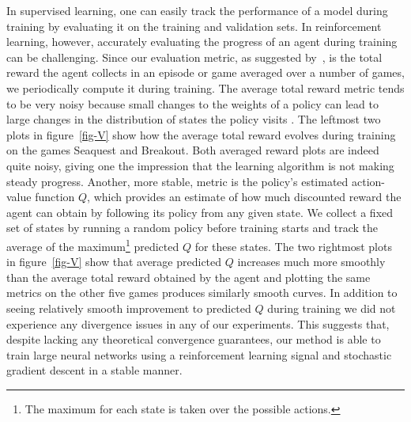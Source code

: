In supervised learning, one can easily track the performance of a model during training by evaluating it on the training and validation sets. In reinforcement learning, however, accurately evaluating the progress of an agent during training can be challenging. 
Since our evaluation metric, as suggested by~\cite{bellemare-ale}, is the total reward the agent collects in an episode or game averaged over a number of games, we periodically compute it during training. The average total reward metric tends to be very noisy because small changes to the weights of a policy can lead to large changes in the distribution of states the policy visits .  The leftmost two plots in figure~\ref{fig-V} show how the average total reward evolves during training on the games Seaquest and Breakout.  Both averaged reward plots are indeed quite noisy, giving one the impression that the learning algorithm is not making steady progress.  Another, more stable, metric is the policy's estimated action-value function $Q$, which provides an estimate of how much discounted reward the agent can obtain by following its policy from any given state.  We collect a fixed set of states by running a random policy before training starts and track the average of the maximum\footnote{The maximum for each state is taken over the possible actions.} predicted $Q$ for these states.  The two rightmost plots in figure~\ref{fig-V} show that average predicted $Q$ increases much more smoothly than the average total reward obtained by the agent and plotting the same metrics on the other five games produces similarly smooth curves.
In addition to seeing relatively smooth improvement to predicted $Q$ during training we did not experience any divergence issues in any of our experiments.  This suggests that, despite lacking any theoretical convergence guarantees, our method is able to train large neural networks using a reinforcement learning signal and stochastic gradient descent in a stable manner.  


